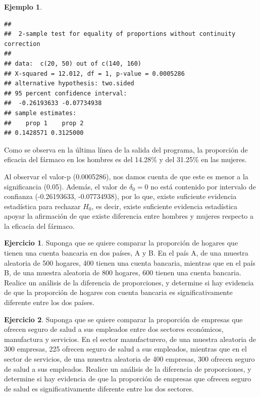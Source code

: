 \documentclass[
  11pt,
]{book}
\theoremstyle{definition}
\theoremstyle{definition}
\newtheorem{example}{Ejemplo}[chapter]
\theoremstyle{definition}
\newtheorem{exercise}{Ejercicio}[chapter]
\theoremstyle{definition}
\theoremstyle{remark}
\begin{document}
\begin{example}
\begin{verbatim}
## 
##  2-sample test for equality of proportions without continuity correction
## 
## data:  c(20, 50) out of c(140, 160)
## X-squared = 12.012, df = 1, p-value = 0.0005286
## alternative hypothesis: two.sided
## 95 percent confidence interval:
##  -0.26193633 -0.07734938
## sample estimates:
##    prop 1    prop 2 
## 0.1428571 0.3125000
\end{verbatim}

Como se observa en la última línea de la salida del programa, la proporción de eficacia del fármaco en los hombres es del 14.28\% y del 31.25\% en las mujeres.

Al observar el valor-p (0.0005286), nos damos cuenta de que este es menor a la significancia (0.05). Además, el valor de \(\delta_0 = 0\) no está contenido por intervalo de confianza (-0.26193633, -0.07734938), por lo que, existe suficiente evidencia estadística para rechazar \(H_0\), es decir, existe suficiente evidencia estadística apoyar la afirmación de que existe diferencia entre hombres y mujeres respecto a la eficacia del fármaco.
\end{example}

\begin{exercise}
Suponga que se quiere comparar la proporción de hogares que tienen una cuenta bancaria en dos países, A y B. En el país A, de una muestra aleatoria de 500 hogares, 400 tienen una cuenta bancaria, mientras que en el país B, de una muestra aleatoria de 800 hogares, 600 tienen una cuenta bancaria. Realice un análisis de la diferencia de proporciones, y determine si hay evidencia de que la proporción de hogares con cuenta bancaria es significativamente diferente entre los dos países.
\end{exercise}

\begin{exercise}
Suponga que se quiere comparar la proporción de empresas que ofrecen seguro de salud a sus empleados entre dos sectores económicos, manufactura y servicios. En el sector manufacturero, de una muestra aleatoria de 300 empresas, 225 ofrecen seguro de salud a sus empleados, mientras que en el sector de servicios, de una muestra aleatoria de 400 empresas, 300 ofrecen seguro de salud a sus empleados. Realice un análisis de la diferencia de proporciones, y determine si hay evidencia de que la proporción de empresas que ofrecen seguro de salud es significativamente diferente entre los dos sectores.
\end{exercise}
\end{document}
